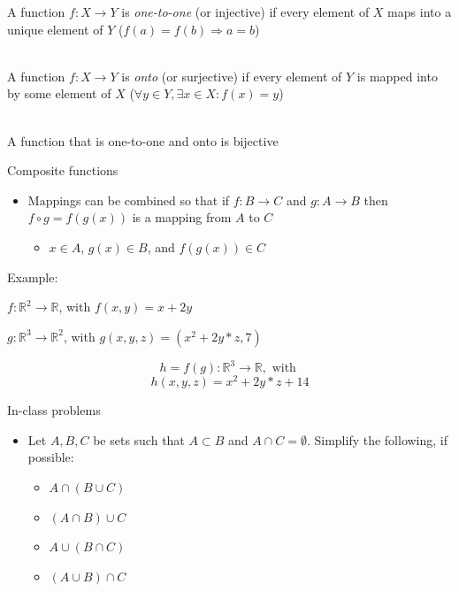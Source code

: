 \documentclass[10pt]{seminar}
\begin{document}
\begin{slide}
\begin{itemize}
\end{itemize}

\newslide

A function $f: X\rightarrow Y$ is \textit{one-to-one} (or injective) if every element of $X$ maps into a unique element of $Y$ ($f(a)=f(b)\Rightarrow a=b$)


\ \\A function $f: X\rightarrow Y$ is \textit{onto} (or surjective) if every element of $Y$ is mapped into by some element of $X$ ($\forall y\in Y, \exists x\in X: f(x)=y$)

\ \\ A function that is one-to-one and onto is bijective

\begin{center}
\end{center}


\newslide

Composite functions

\begin{itemize}
\item Mappings can be combined so that if $f:B\rightarrow C$ and $g: A\rightarrow B$ then $f\circ g = f(g(x))$ is a mapping from $A$ to $C$

\begin{itemize}
\item $x\in A$, $g(x)\in B$, and $f(g(x))\in C$
\end{itemize}
\end{itemize}

Example: 

$f: \mathbb{R}^2\rightarrow \mathbb{R}$, with $f(x, y)=x+2y$

$g: \mathbb{R}^3\rightarrow \mathbb{R}^2$, with $g(x, y, z)=(x^2+2y*z, 7)$

$$h=f(g): \mathbb{R}^3\rightarrow\mathbb{R}, \text{ with }$$
$$h(x, y, z)=x^2+2y*z+14$$


\newslide

In-class problems

\begin{itemize}


\item[3.1.2] Let $A, B, C$ be sets such that $A\subset B$ and $A\cap C=\emptyset$.  Simplify the following, if possible:

\begin{itemize}
\item $A\cap(B\cup C)$ %
\item $(A\cap B)\cup C$ %
\item $A\cup(B\cap C)$ %
\item $(A\cup B)\cap C$ %



\end{itemize}
\end{itemize}
\end{slide}
\end{document}
